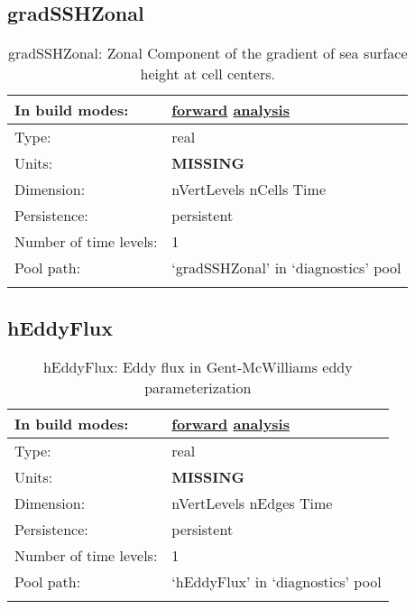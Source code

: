 \subsection[gradSSHZonal]{gradSSHZonal}
\label{subsec:var_sec_diagnostics_gradSSHZonal}
\begin{center}
\begin{longtable}{| p{2.0in} | p{4.0in} |}
        \hline 
        In build modes: & \hyperref[subsec:forward_var_tab_diagnostics]{forward} \hyperref[subsec:analysis_var_tab_diagnostics]{analysis} \\
        \hline 
        Type: & real \\
        \hline 
        Units: & {\bf \color{red} MISSING} \\
        \hline 
        Dimension: & nVertLevels nCells Time \\
        \hline 
        Persistence: & persistent \\
        \hline 
        Number of time levels: & 1 \\
        \hline 
            Pool path: & `gradSSHZonal' in `diagnostics' pool \\
		 \hline 
    \caption{gradSSHZonal: Zonal Component of the gradient of sea surface height at cell centers.}
\end{longtable}
\end{center}
\subsection[hEddyFlux]{hEddyFlux}
\label{subsec:var_sec_diagnostics_hEddyFlux}
\begin{center}
\begin{longtable}{| p{2.0in} | p{4.0in} |}
        \hline 
        In build modes: & \hyperref[subsec:forward_var_tab_diagnostics]{forward} \hyperref[subsec:analysis_var_tab_diagnostics]{analysis} \\
        \hline 
        Type: & real \\
        \hline 
        Units: & {\bf \color{red} MISSING} \\
        \hline 
        Dimension: & nVertLevels nEdges Time \\
        \hline 
        Persistence: & persistent \\
        \hline 
        Number of time levels: & 1 \\
        \hline 
            Pool path: & `hEddyFlux' in `diagnostics' pool \\
		 \hline 
    \caption{hEddyFlux: Eddy flux in Gent-McWilliams eddy parameterization}
\end{longtable}
\end{center}
